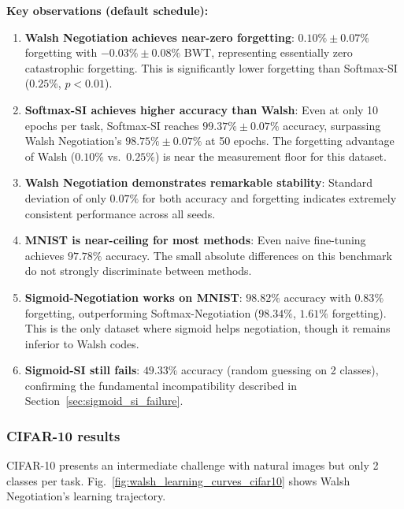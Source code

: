 \documentclass[preprint,review,12pt]{elsarticle}
\begin{document}
\textbf{Key observations (default schedule):}
\begin{enumerate}
\item \textbf{Walsh Negotiation achieves near-zero forgetting}: $0.10\% \pm 0.07\%$ forgetting with $-0.03\% \pm 0.08\%$ BWT, representing essentially zero catastrophic forgetting. This is significantly lower forgetting than Softmax-SI ($0.25\%$, $p < 0.01$).

\item \textbf{Softmax-SI achieves higher accuracy than Walsh}: Even at only 10 epochs per task, Softmax-SI reaches $99.37\% \pm 0.07\%$ accuracy, surpassing Walsh Negotiation's $98.75\% \pm 0.07\%$ at 50 epochs. The forgetting advantage of Walsh ($0.10\%$ vs.\ $0.25\%$) is near the measurement floor for this dataset.

\item \textbf{Walsh Negotiation demonstrates remarkable stability}: Standard deviation of only $0.07\%$ for both accuracy and forgetting indicates extremely consistent performance across all seeds.

\item \textbf{MNIST is near-ceiling for most methods}: Even naive fine-tuning achieves $97.78\%$ accuracy. The small absolute differences on this benchmark do not strongly discriminate between methods.

\item \textbf{Sigmoid-Negotiation works on MNIST}: $98.82\%$ accuracy with $0.83\%$ forgetting, outperforming Softmax-Negotiation ($98.34\%$, $1.61\%$ forgetting). This is the only dataset where sigmoid helps negotiation, though it remains inferior to Walsh codes.

\item \textbf{Sigmoid-SI still fails}: $49.33\%$ accuracy (random guessing on 2 classes), confirming the fundamental incompatibility described in Section~\ref{sec:sigmoid_si_failure}.
\end{enumerate}

\subsubsection{CIFAR-10 results}

CIFAR-10 presents an intermediate challenge with natural images but only 2 classes per task. Fig.~\ref{fig:walsh_learning_curves_cifar10} shows Walsh Negotiation's learning trajectory.
\end{document}
